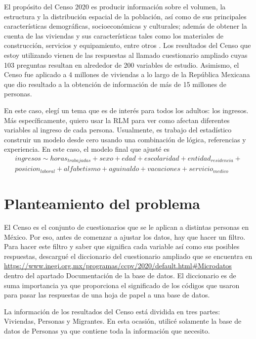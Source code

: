 El propósito del Censo 2020 es producir información sobre el volumen, la estructura y la distribución espacial de la población, así como de sus principales características demográficas, socioeconómicas y culturales; además de obtener la cuenta de las viviendas y sus características tales como los materiales de construcción, servicios y equipamiento, entre otros . Los resultados del Censo que estoy utilizando vienen de las respuestas al llamado cuestionario ampliado cuyas 103 preguntas resultan en alrededor de 200 variables de estudio. Asimismo, el Censo fue aplicado a 4 millones de viviendas a lo largo de la República Mexicana que dio resultado a la obtención de información de más de 15 millones de personas.

En este caso, elegí un tema que es de interés para todos los adultos: los ingresos. Más específicamente, quiero usar la RLM para ver como afectan diferentes variables al ingreso de cada persona. Usualmente, es trabajo del estadístico construir un modelo desde cero usando una combinación de lógica, referencias y experiencia. En este caso, el modelo final que ajusté es 
\begin{equation} \label{modelo_final}
    \begin{aligned}
    ingresos \sim horas_{trabajadas} + sexo + edad + escolaridad + entidad_{residencia} + \\ posicion_{laboral} + alfabetismo + aguinaldo + vacaciones + servicio_{medico}
    \end{aligned}
\end{equation}


\section{Planteamiento del problema}
El Censo es el conjunto de cuestionarios que se le aplican a distintas personas en México. Por eso, antes de comenzar a ajustar los datos, hay que hacer un filtro. Para hacer este filtro y saber que significa cada variable así como sus posibles respuestas, descargué el diccionario del cuestionario ampliado que se encuentra en \url{https://www.inegi.org.mx/programas/ccpv/2020/default.html#Microdatos} dentro del apartado \textsf{Documentación de la base de datos}. El diccionario es de suma importancia ya que proporciona el significado de los códigos que usaron para pasar las respuestas de una hoja de papel a una base de datos. 


La información de los resultados del Censo está dividida en tres partes: Viviendas, Personas y Migrantes. En esta ocasión, utilicé solamente la base de datos de Personas ya que contiene toda la información que necesito. 


